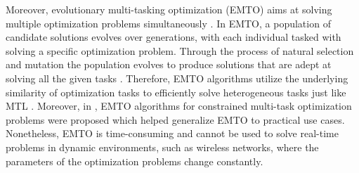 Moreover,  evolutionary multi-tasking optimization (EMTO) aims at solving multiple optimization problems simultaneously \cite{MTO1}.
In EMTO, a population of candidate solutions evolves over generations, with each individual tasked with solving a specific optimization problem. 
Through the process of natural selection and mutation the population evolves to produce solutions that are adept at solving all the given tasks \cite{MTO2}. Therefore, EMTO algorithms utilize the underlying similarity of optimization tasks to efficiently solve heterogeneous tasks just like MTL \cite{MTO3}. Moreover, in \cite{MTO4,MTO5}, EMTO algorithms for constrained multi-task optimization problems were proposed which helped generalize EMTO to practical use cases. Nonetheless, EMTO is time-consuming and cannot be used to solve real-time problems in dynamic environments, such as wireless networks, where the parameters of the optimization problems change constantly.